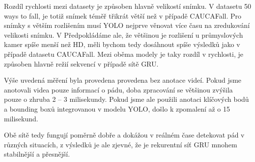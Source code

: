 Rozdíl rychlosti mezi datasety je způsoben hlavně velikostí snímku. V datasetu
50 ways to fall, je totiž snímek téměř třikrát větší než v případě CAUCAFall.
Pro snímky s větším rozlišením musí YOLO nejprve věnovat více času na
zredukování velikosti snímku. V Předpokládáme ale, že většinou je rozlišení u
průmyslových kamer spíše menší než HD, měli bychom tedy dosáhnout spíše
výsledků jako v případě datasetu CAUCAFall. Mezi oběma modely je taky rozdíl v
rychlosti, je způsoben hlavně režií sekvencí v případě sítě GRU.

Výše uvedená měření byla provedena provedena bez anotace videí. Pokud jsme
anotovali videa pouze informací o pádu, doba zpracování se většinou zvýšila
pouze o zhruba 2 – 3 milisekundy. Pokud jsme ale použili anotaci klíčových bodů
a bounding boxů integrovanou v modelu YOLO, došlo k zpomalení až o 15
milisekund.

Obě sítě tedy fungují poměrně dobře a dokážou v reálném čase detekovat pád v
různých situacích, z výsledků je ale zjevné, že je rekurentní síť GRU mnohem
stabilnější a přesnější.

